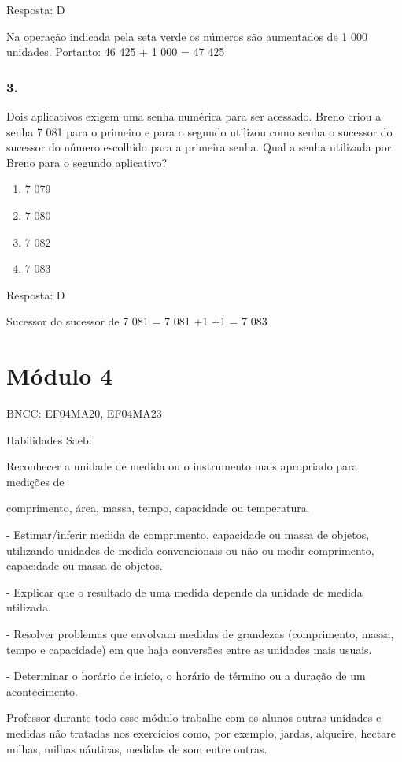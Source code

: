 Resposta: D

Na operação indicada pela seta verde os números são aumentados de 1 000
unidades. Portanto: 46 425 + 1 000 = 47 425

\subsubsection{3.}\label{section-38}

Dois aplicativos exigem uma senha numérica para ser acessado. Breno
criou a senha 7 081 para o primeiro e para o segundo utilizou como senha
o sucessor do sucessor do número escolhido para a primeira senha. Qual a
senha utilizada por Breno para o segundo aplicativo?

\begin{enumerate}
\def\labelenumi{\alph{enumi})}
\item
  7 079
\item
  7 080
\item
  7 082
\item
  7 083
\end{enumerate}

Resposta: D

Sucessor do sucessor de 7 081 = 7 081 +1 +1 = 7 083

\section{Módulo 4}\label{muxf3dulo-4}

BNCC: EF04MA20, EF04MA23

Habilidades Saeb:

Reconhecer a unidade de medida ou o instrumento mais apropriado para
medições de

comprimento, área, massa, tempo, capacidade ou temperatura.

- Estimar/inferir medida de comprimento, capacidade ou massa de objetos,
utilizando unidades de medida convencionais ou não ou medir comprimento,
capacidade ou massa de objetos.

- Explicar que o resultado de uma medida depende da unidade de medida
utilizada.

- Resolver problemas que envolvam medidas de grandezas (comprimento,
massa, tempo e capacidade) em que haja conversões entre as unidades mais
usuais.

- Determinar o horário de início, o horário de término ou a duração de
um acontecimento.

Professor durante todo esse módulo trabalhe com os alunos outras
unidades e medidas não tratadas nos exercícios como, por exemplo,
jardas, alqueire, hectare milhas, milhas náuticas, medidas de som entre
outras.

